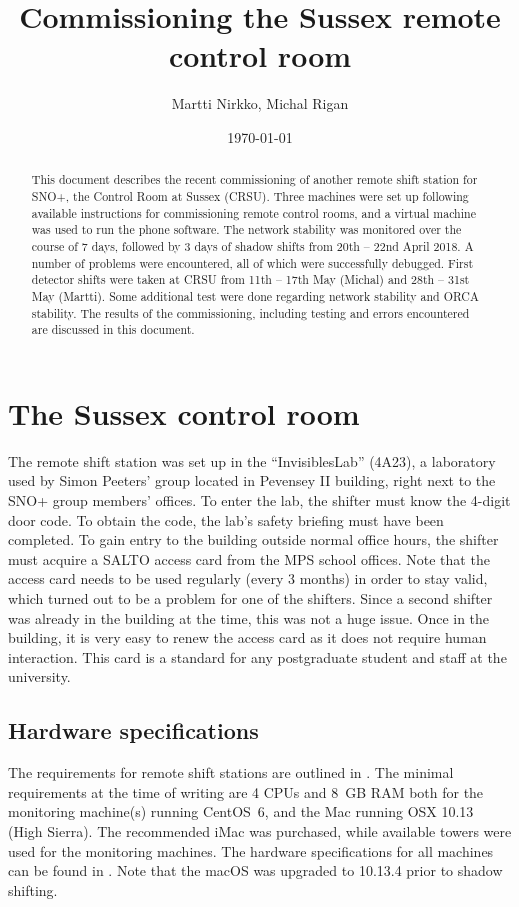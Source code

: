 \documentclass[a4paper,10pt]{article}
\title{Commissioning the Sussex remote control room}
\author{Martti Nirkko, Michal Rigan}
\affil{University of Sussex}
\date{\today}
\begin{document}
\maketitle

\begin{abstract}
This document describes the recent commissioning of another remote shift station for SNO+, the Control Room at Sussex (CRSU). Three machines were set up following available instructions for commissioning remote control rooms, and a virtual machine was used to run the phone software. The network stability was monitored over the course of 7 days, followed by 3 days of shadow shifts from 20th -- 22nd April 2018. A number of problems were encountered, all of which were successfully debugged. First detector shifts were taken at CRSU from 11th -- 17th May (Michal) and 28th -- 31st May (Martti). Some additional test were done regarding network stability and ORCA stability. The results of the commissioning, including testing and errors encountered are discussed in this document.
\end{abstract}


\section{The Sussex control room}
The remote shift station was set up in the ``InvisiblesLab'' (4A23), a laboratory used by Simon Peeters' group located in Pevensey II building, right next to the SNO+ group members' offices. To enter the lab, the shifter must know the 4-digit door code. To obtain the code, the lab's safety briefing must have been completed. To gain entry to the building outside normal office hours, the shifter must acquire a SALTO access card from the MPS school offices. Note that the access card needs to be used regularly (every 3 months) in order to stay valid, which turned out to be a problem for one of the shifters. Since a second shifter was already in the building at the time, this was not a huge issue. Once in the building, it is very easy to renew the access card as it does not require human interaction. This card is a standard for any postgraduate student and staff at the university.

\subsection{Hardware specifications}
The requirements for remote shift stations are outlined in \cite{doc4428}. The minimal requirements at the time of writing are 4 CPUs and 8~GB RAM both for the monitoring machine(s) running CentOS~6, and the Mac running OSX 10.13 (High Sierra). The recommended iMac was purchased, while available towers were used for the monitoring machines. The hardware specifications for all machines can be found in . Note that the macOS was upgraded to 10.13.4 prior to shadow shifting.
\end{document}
